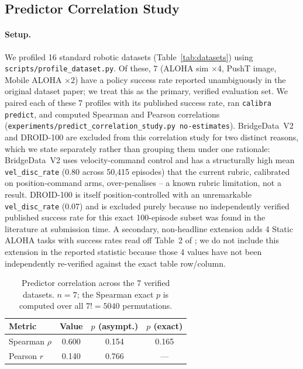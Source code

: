 \documentclass[10pt,twocolumn]{article}
\begin{document}
\subsection{Predictor Correlation Study}
\label{sec:predictor_exp}

\paragraph{Setup.}
We profiled 16 standard robotic datasets (Table~\ref{tab:datasets}) using
\texttt{scripts/profile\_dataset.py}. Of these, 7 (ALOHA sim $\times$4, PushT
image, Mobile ALOHA $\times$2) have a policy success rate reported
unambiguously in the original dataset paper; we treat this as the primary,
verified evaluation set. We paired each of these 7 profiles with its
published success rate, ran \texttt{calibra predict}, and computed Spearman
and Pearson correlations
(\texttt{experiments/predict\_correlation\_study.py \-\-no-estimates}).
BridgeData~V2 and DROID-100 are excluded from this correlation study for two
distinct reasons, which we state separately rather than grouping them under
one rationale: BridgeData~V2 uses velocity-command control and has a
structurally high mean \texttt{vel\_disc\_rate} (0.80 across 50{,}415
episodes) that the current rubric, calibrated on position-command arms,
over-penalises -- a known rubric limitation, not a result. DROID-100 is
itself position-controlled with an unremarkable \texttt{vel\_disc\_rate}
(0.07) and is excluded purely because no independently verified published
success rate for this exact 100-episode subset was found in the literature
at submission time. A secondary, non-headline extension adds 4 Static ALOHA
tasks with success rates read off Table~2 of \citet{zhao2023act}; we do not
include this extension in the reported statistic because those 4 values have
not been independently re-verified against the exact table row/column.

\begin{table}[h]
\centering
\caption{Predictor correlation across the 7 verified datasets. $n=7$; the
Spearman exact $p$ is computed over all $7! = 5040$ permutations.}
\label{tab:predict}
\small
\begin{tabular}{lccc}
\toprule
\textbf{Metric} & \textbf{Value} & \textbf{$p$ (asympt.)} & \textbf{$p$ (exact)} \\
\midrule
Spearman $\rho$ & 0.600 & 0.154 & 0.165 \\
Pearson $r$ & 0.140 & 0.766 & --- \\
\bottomrule
\end{tabular}
\end{table}
\end{document}
